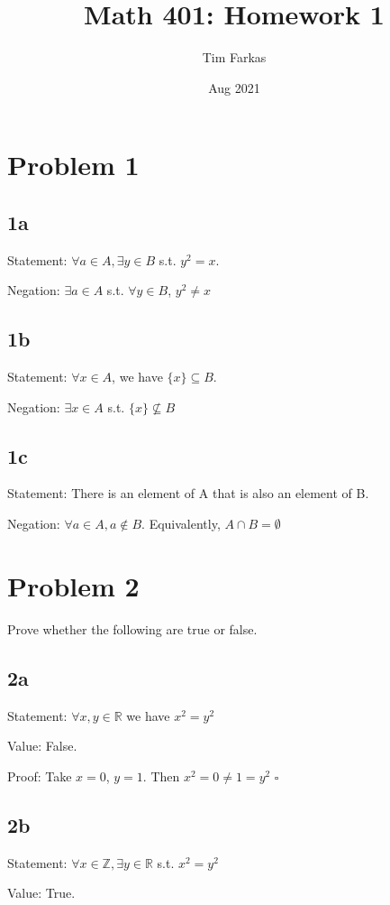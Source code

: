 \documentclass{article}
\title{Math 401: Homework 1}
\author{Tim Farkas}
\date{Aug 2021}
\begin{document}
\maketitle

\section*{Problem 1}

\subsection*{1a}
Statement: $\forall a \in A, \exists y \in B$ s.t. $ y^2 = x$.

Negation: $\exists a \in A$ s.t. $\forall y \in B$, $y^2 \ne x$

\subsection*{1b}
Statement: $\forall x \in A$, we have $\{x\} \subseteq B$. 

Negation: $\exists x \in A$ s.t. $\{x\} \nsubseteq B$

\subsection*{1c}
Statement: There is an element of A that is also an element of B. 

Negation: $\forall a \in A, a \notin B$. Equivalently, $A \cap B = \emptyset$ 

\section*{Problem 2}
Prove whether the following are true or false. 

\subsection*{2a}
Statement: $\forall x,y \in \mathbb{R}$ we have $x^2 = y^2$

Value: False. 

Proof: Take $x = 0$, $y = 1$. Then $x^2 = 0 \ne 1 = y^2$ $\square$
\subsection*{2b}
Statement: $\forall x \in \mathbb{Z}, \exists y \in \mathbb{R}$ s.t. $x^2 = y^2$

Value: True. 
\end{document}
